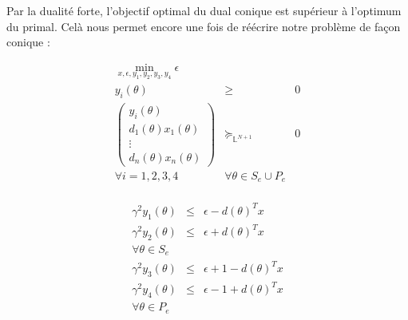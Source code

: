 Par la dualité forte, l'objectif optimal du dual conique est supérieur à l'optimum du primal. Celà nous permet encore une fois de réécrire notre problème de façon conique :
\begin{center}
\begin{minipage}{0.4\textwidth}
\begin{eqnarray*}
\min_{x,\epsilon ,y_1,y_2,y_3,y_4} \epsilon & & \\
y_{i}(\theta) & \geq & 0 \\
\begin{pmatrix}
y_i(\theta) \\
d_1(\theta)x_1(\theta)\\
\vdots \\
d_n(\theta)x_n(\theta)
\end{pmatrix}
& \succeq_{\mathbb{L}^{N+1}}& 0\\
\forall i = 1,2,3,4 &
\forall \theta \in S_e \cup P_e & \\
\end{eqnarray*}
\end{minipage}
\vline
\begin{minipage}{0.4\textwidth}
\begin{eqnarray*}
\gamma^2 y_{1}(\theta) & \leq & \epsilon -d(\theta)^Tx \\
\gamma^2 y_{2}(\theta) & \leq & \epsilon + d(\theta)^Tx \\
\forall \theta \in S_e & & \\
\gamma^2 y_{3}(\theta) & \leq & \epsilon +1 -d(\theta)^Tx \\
\gamma^2 y_{4}(\theta) & \leq & \epsilon -1 + d(\theta)^Tx \\
\forall \theta \in P_e & &
\end{eqnarray*}
\end{minipage}
\end{center}

